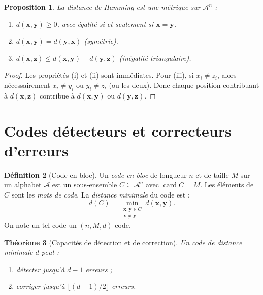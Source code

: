 \documentclass[12pt,a4paper,openany]{book}
\theoremstyle{definition}
\newtheorem{definition}{Définition}[chapter]
\theoremstyle{plain}
\newtheorem{theoreme}[definition]{Théorème}
\newtheorem{proposition}[definition]{Proposition}
\theoremstyle{remark}
\DeclareMathOperator{\card}{card}
\begin{document}
\begin{proposition}
La distance de Hamming est une métrique sur $\mathcal{A}^n$ :
\begin{enumerate}[label=(\roman*)]
  \item $d(\mathbf{x}, \mathbf{y}) \geq 0$, avec égalité si et seulement
        si $\mathbf{x} = \mathbf{y}$.
  \item $d(\mathbf{x}, \mathbf{y}) = d(\mathbf{y}, \mathbf{x})$
        (symétrie).
  \item $d(\mathbf{x}, \mathbf{z}) \leq d(\mathbf{x}, \mathbf{y}) +
        d(\mathbf{y}, \mathbf{z})$ (inégalité triangulaire).
\end{enumerate}
\end{proposition}

\begin{proof}
Les propriétés (i) et (ii) sont immédiates. Pour (iii), si
$x_i \neq z_i$, alors nécessairement $x_i \neq y_i$ ou $y_i \neq z_i$
(ou les deux). Donc chaque position contribuant à $d(\mathbf{x},
\mathbf{z})$ contribue à $d(\mathbf{x}, \mathbf{y})$ ou
$d(\mathbf{y}, \mathbf{z})$.
\end{proof}

\section{Codes détecteurs et correcteurs d'erreurs}
\label{sec:detection-correction}

\begin{definition}[Code en bloc]
\label{def:code-bloc}
Un \emph{code en bloc} de longueur $n$ et de taille $M$ sur un alphabet
$\mathcal{A}$ est un sous-ensemble $C \subseteq \mathcal{A}^n$ avec
$\card{C} = M$. Les éléments de $C$ sont les \emph{mots de code}. La
\emph{distance minimale} du code est :
\[
  d(C) = \min_{\substack{\mathbf{x}, \mathbf{y} \in C \\
         \mathbf{x} \neq \mathbf{y}}} d(\mathbf{x}, \mathbf{y}).
\]
On note un tel code un $(n, M, d)$-code.
\end{definition}

\begin{theoreme}[Capacités de détection et de correction]
\label{thm:detection-correction}
Un code de distance minimale $d$ peut :
\begin{enumerate}[label=(\roman*)]
  \item détecter jusqu'à $d-1$ erreurs ;
  \item corriger jusqu'à $\lfloor (d-1)/2 \rfloor$ erreurs.
\end{enumerate}
\end{theoreme}
\end{document}
